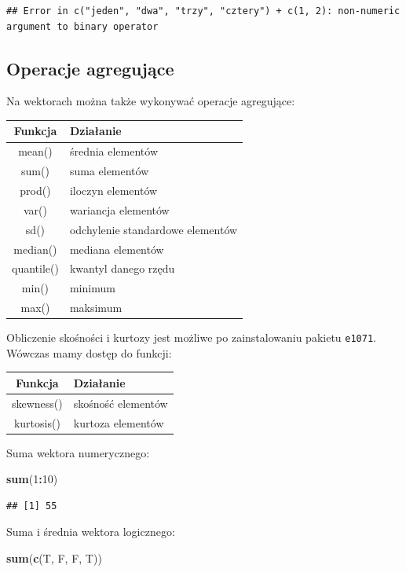 \documentclass[]{book}
\newenvironment{Shaded}{\begin{snugshade}}{\end{snugshade}}
\newcommand{\KeywordTok}[1]{\textcolor[rgb]{0.13,0.29,0.53}{\textbf{#1}}}
\newcommand{\DecValTok}[1]{\textcolor[rgb]{0.00,0.00,0.81}{#1}}
\newcommand{\OperatorTok}[1]{\textcolor[rgb]{0.81,0.36,0.00}{\textbf{#1}}}
\newcommand{\NormalTok}[1]{#1}
\begin{document}
\begin{verbatim}
## Error in c("jeden", "dwa", "trzy", "cztery") + c(1, 2): non-numeric argument to binary operator
\end{verbatim}

\subsection{Operacje agregujące}\label{operacje-agregujace}

Na wektorach można także wykonywać operacje agregujące:

\begin{longtable}[]{@{}cl@{}}
\toprule
Funkcja & Działanie\tabularnewline
\midrule
\endhead
mean() & średnia elementów\tabularnewline
sum() & suma elementów\tabularnewline
prod() & iloczyn elementów\tabularnewline
var() & wariancja elementów\tabularnewline
sd() & odchylenie standardowe elementów\tabularnewline
median() & mediana elementów\tabularnewline
quantile() & kwantyl danego rzędu\tabularnewline
min() & minimum\tabularnewline
max() & maksimum\tabularnewline
\bottomrule
\end{longtable}

Obliczenie skośności i kurtozy jest możliwe po zainstalowaniu pakietu
\texttt{e1071}. Wówczas mamy dostęp do funkcji:

\begin{longtable}[]{@{}cl@{}}
\toprule
Funkcja & Działanie\tabularnewline
\midrule
\endhead
skewness() & skośność elementów\tabularnewline
kurtosis() & kurtoza elementów\tabularnewline
\bottomrule
\end{longtable}

Suma wektora numerycznego:

\begin{Shaded}
\begin{Highlighting}[]
\KeywordTok{sum}\NormalTok{(}\DecValTok{1}\OperatorTok{:}\DecValTok{10}\NormalTok{)}
\end{Highlighting}
\end{Shaded}

\begin{verbatim}
## [1] 55
\end{verbatim}

Suma i średnia wektora logicznego:

\begin{Shaded}
\begin{Highlighting}[]
\KeywordTok{sum}\NormalTok{(}\KeywordTok{c}\NormalTok{(T, F, F, T))}
\end{Highlighting}
\end{Shaded}
\end{document}
